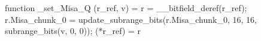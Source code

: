 function _set_Misa_Q (r_ref, v) = {
    r = __bitfield_deref(r_ref);
    r.Misa_chunk_0 = update_subrange_bits(r.Misa_chunk_0, 16, 16, subrange_bits(v, 0, 0));
    (*r_ref) = r
}
